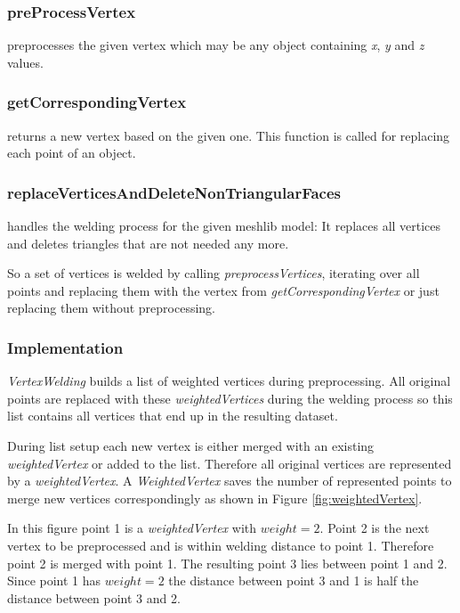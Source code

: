 \documentclass[../ClassicThesis.tex]{subfiles}
\begin{document}
\subsubsection*{preProcessVertex}

preprocesses the given vertex which may be any object containing \emph{x}, \emph{y} and \emph{z} values.

\subsubsection*{getCorrespondingVertex}

returns a new vertex based on the given one. This function is called for replacing each point of an object.

\subsubsection*{replaceVerticesAndDeleteNonTriangularFaces}

handles the welding process for the given meshlib model: It replaces all vertices and deletes triangles that are not needed any more.


So a set of vertices is welded by calling \emph{preprocessVertices}, iterating over all points and replacing them with the vertex from \emph{getCorrespondingVertex} or just replacing them without preprocessing.


\subsubsection{Implementation}

\emph{VertexWelding} builds a list of weighted vertices during preprocessing. All original points are replaced with these \emph{weightedVertices} during the welding process so this list contains all vertices that end up in the resulting dataset.

During list setup each new vertex is either merged with an existing \emph{weightedVertex} or added to the list. Therefore all original vertices are represented by a \emph{weightedVertex}. A \emph{WeightedVertex} saves the number of represented points to merge new vertices correspondingly as shown in Figure \ref{fig:weightedVertex}.

In this figure point 1 is a \emph{weightedVertex} with $weight = 2 $. Point 2 is the next vertex to be preprocessed and is within welding distance to point 1. Therefore point 2 is merged with point 1. The resulting point 3 lies between point 1 and 2. Since point 1 has $ weight = 2 $ the distance between point 3 and 1 is half the distance between point 3 and 2.
\end{document}
